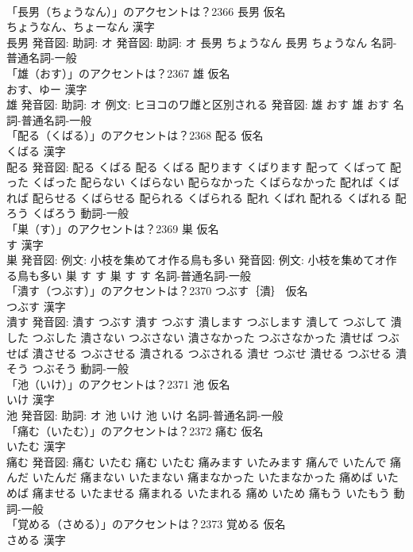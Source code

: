 \documentclass[8pt]{extreport}
\begin{document}
\begin{CJK}{UTF8}{min}
\\	「長男（ちょうなん）」のアクセントは？2366	長男 仮名　
\\	ちょうなん、ちょーなん 漢字　
\\	長男 発音図: 助詞: オ 発音図: 助詞: オ	長男 ちょうなん		長男 ちょうなん				名詞-普通名詞-一般 
\\	「雄（おす）」のアクセントは？2367	雄 仮名　
\\	おす、ゆー 漢字　
\\	雄 発音図: 助詞: オ 例文: ヒヨコのワ雌と区別される 発音図:	雄 おす		雄 おす				名詞-普通名詞-一般 
\\	「配る（くばる）」のアクセントは？2368	配る 仮名　
\\	くばる 漢字　
\\	配る 発音図:	配る くばる		配る くばる 配ります くばります 配って くばって 配った くばった 配らない くばらない 配らなかった くばらなかった 配れば くばれば 配らせる くばらせる 配られる くばられる 配れ くばれ 配れる くばれる 配ろう くばろう				動詞-一般 
\\	「巣（す）」のアクセントは？2369	巣 仮名　
\\	す 漢字　
\\	巣 発音図: 例文: 小枝を集めてオ作る鳥も多い 発音図: 例文: 小枝を集めてオ作る鳥も多い	巣 す す		巣 す す				名詞-普通名詞-一般 
\\	「潰す（つぶす）」のアクセントは？2370	つぶす｛潰｝ 仮名　
\\	つぶす 漢字　
\\	潰す 発音図:	潰す つぶす		潰す つぶす 潰します つぶします 潰して つぶして 潰した つぶした 潰さない つぶさない 潰さなかった つぶさなかった 潰せば つぶせば 潰させる つぶさせる 潰される つぶされる 潰せ つぶせ 潰せる つぶせる 潰そう つぶそう				動詞-一般 
\\	「池（いけ）」のアクセントは？2371	池 仮名　
\\	いけ 漢字　
\\	池 発音図: 助詞: オ	池 いけ		池 いけ				名詞-普通名詞-一般 
\\	「痛む（いたむ）」のアクセントは？2372	痛む 仮名　
\\	いたむ 漢字　
\\	痛む 発音図:	痛む いたむ		痛む いたむ 痛みます いたみます 痛んで いたんで 痛んだ いたんだ 痛まない いたまない 痛まなかった いたまなかった 痛めば いためば 痛ませる いたませる 痛まれる いたまれる 痛め いため 痛もう いたもう				動詞-一般 
\\	「覚める（さめる）」のアクセントは？2373	覚める 仮名　
\\	さめる 漢字　

\end{CJK}
\end{document}
